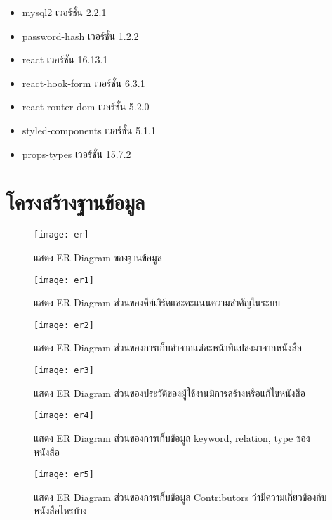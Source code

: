 \begin{enumerate}
\begin{itemize}
		        \item mysql2 เวอร์ชั่น 2.2.1
		        \item password-hash เวอร์ชั่น 1.2.2
		        \item react เวอร์ชั่น 16.13.1
		        \item react-hook-form เวอร์ชั่น 6.3.1
		        \item react-router-dom เวอร์ชั่น 5.2.0
		        \item styled-components เวอร์ชั่น 5.1.1
		        \item props-types เวอร์ชั่น 15.7.2
            \end{itemize}
        \end{enumerate}
		
\section{โครงสร้างฐานข้อมูล}

\begin{figure}[H]
    \centering
    \texttt{[image: er]}
    \caption{แสดง ER Diagram ของฐานข้อมูล}\label{fig:er}
\end{figure}

\begin{figure}[H]
    \centering
    \texttt{[image: er1]}
    \caption{แสดง ER Diagram ส่วนของคีย์เวิร์ดและคะแนนความสำคัญในระบบ}\label{fig:er1}
\end{figure}


\begin{figure}[H]
    \centering
    \texttt{[image: er2]}
    \caption{แสดง ER Diagram ส่วนของการเก็บคำจากแต่ละหน้าที่แปลงมาจากหนังสือ}\label{fig:er2}
\end{figure}


\begin{figure}[H]
    \centering
    \texttt{[image: er3]}
    \caption{แสดง ER Diagram ส่วนของประวัติของผู้ใช้งานมีการสร้างหรือแก้ไขหนังสือ}\label{fig:er3}
\end{figure}



\begin{figure}[H]
    \centering
    \texttt{[image: er4]}
    \caption{แสดง ER Diagram ส่วนของการเก็บข้อมูล keyword, relation, type ของหนังสือ}\label{fig:er4}
\end{figure}

\begin{figure}[H]
    \centering
    \texttt{[image: er5]}
    \caption{แสดง ER Diagram ส่วนของการเก็บข้อมูล Contributors ว่ามีความเกี่ยวข้องกับหนังสือไหรบ้าง}\label{fig:er5}
\end{figure}

